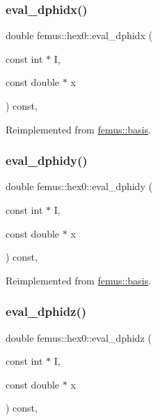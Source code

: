 \subsubsection{\texorpdfstring{eval\+\_\+dphidx()}{eval\_dphidx()}}
{\footnotesize\ttfamily double femus\+::hex0\+::eval\+\_\+dphidx (\begin{DoxyParamCaption}\item[{const int $\ast$}]{I,  }\item[{const double $\ast$}]{x }\end{DoxyParamCaption}) const\hspace{0.3cm}{\ttfamily [inline]}, {\ttfamily [virtual]}}



Reimplemented from \mbox{\hyperlink{classfemus_1_1basis_a4db7d29cf8a753ddbccc4a297dafa0bf}{femus\+::basis}}.

\mbox{\label{classfemus_1_1hex0_a8db705e3c8fdcc9b628fe8ce168c91bb}} 
\subsubsection{\texorpdfstring{eval\+\_\+dphidy()}{eval\_dphidy()}}
{\footnotesize\ttfamily double femus\+::hex0\+::eval\+\_\+dphidy (\begin{DoxyParamCaption}\item[{const int $\ast$}]{I,  }\item[{const double $\ast$}]{x }\end{DoxyParamCaption}) const\hspace{0.3cm}{\ttfamily [inline]}, {\ttfamily [virtual]}}



Reimplemented from \mbox{\hyperlink{classfemus_1_1basis_a2819fac9aae797156b9efec8a0b85cc1}{femus\+::basis}}.

\mbox{\label{classfemus_1_1hex0_a9273324eeab48b6d166b11f167e89de1}} 
\subsubsection{\texorpdfstring{eval\+\_\+dphidz()}{eval\_dphidz()}}
{\footnotesize\ttfamily double femus\+::hex0\+::eval\+\_\+dphidz (\begin{DoxyParamCaption}\item[{const int $\ast$}]{I,  }\item[{const double $\ast$}]{x }\end{DoxyParamCaption}) const\hspace{0.3cm}{\ttfamily [inline]}, {\ttfamily [virtual]}}



